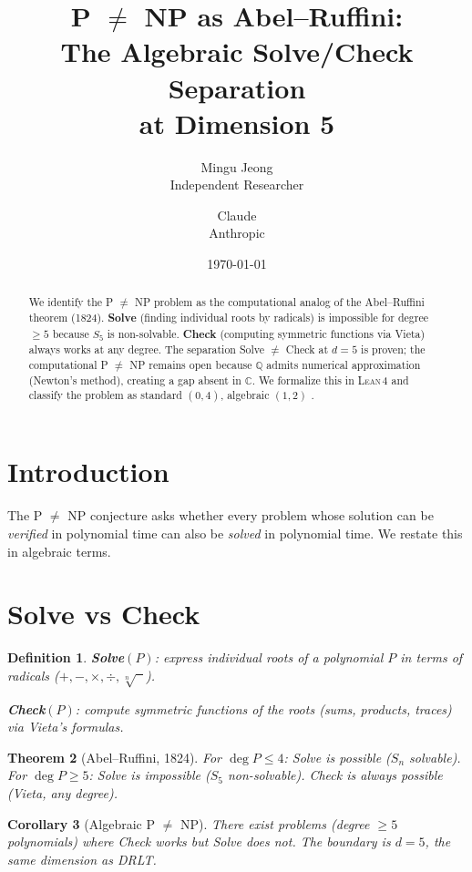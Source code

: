 \documentclass[12pt]{article}
\title{P $\ne$ NP as Abel--Ruffini:\\
  The Algebraic Solve/Check Separation\\
  at Dimension 5}
\author{Mingu Jeong\\Independent Researcher
\and Claude\\Anthropic}
\date{\today}
\newtheorem{theorem}{Theorem}[section]
\newtheorem{corollary}[theorem]{Corollary}
\newtheorem{definition}[theorem]{Definition}
\theoremstyle{remark}
\newcommand{\CC}{\mathbb{C}}
\newcommand{\QQ}{\mathbb{Q}}
\newcommand{\Lean}{\textsc{Lean\,4}}
\begin{document}
\maketitle

\begin{abstract}
We identify the P $\ne$ NP problem as the computational
analog of the Abel--Ruffini theorem (1824). \textbf{Solve}
(finding individual roots by radicals) is impossible for
degree $\ge 5$ because $S_5$ is non-solvable.
\textbf{Check} (computing symmetric functions via Vieta)
always works at any degree. The separation Solve $\ne$ Check
at $d = 5$ is proven; the computational P $\ne$ NP remains
open because $\QQ$ admits numerical approximation (Newton's
method), creating a gap absent in $\CC$. We formalize this
in \Lean{} and classify the problem as
standard $(0, 4)$, algebraic $(1, 2)$ \cite{Paper9}.
\end{abstract}

\section{Introduction}

The P $\ne$ NP conjecture asks whether every problem whose
solution can be \emph{verified} in polynomial time can also
be \emph{solved} in polynomial time. We restate this in
algebraic terms.

\section{Solve vs Check}

\begin{definition}
\textbf{Solve}$(P)$: express individual roots of a polynomial $P$
in terms of radicals ($+, -, \times, \div, \sqrt[n]{\phantom{x}}$).

\textbf{Check}$(P)$: compute symmetric functions of the roots
(sums, products, traces) via Vieta's formulas.
\end{definition}

\begin{theorem}[Abel--Ruffini, 1824]
For $\deg P \le 4$: Solve is possible ($S_n$ solvable).
For $\deg P \ge 5$: Solve is impossible ($S_5$ non-solvable).
Check is always possible (Vieta, any degree).
\end{theorem}

\begin{corollary}[Algebraic P $\ne$ NP]
There exist problems (degree $\ge 5$ polynomials) where
Check works but Solve does not. The boundary is $d = 5$,
the same dimension as DRLT.
\end{corollary}
\end{document}
